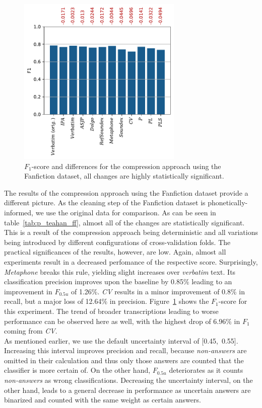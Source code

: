 \begin{figure}
  \centering
  \includegraphics[width=0.7\textwidth]{figures/results_f1_ff_teahan}
  \caption{$F_1$-score and differences for the compression approach using the Fanfiction dataset, all changes are highly statistically significant.}
  \label{fig:results_f1_ff_teahan}
\end{figure}
The results of the compression approach using the Fanfiction dataset provide a different picture.
As the cleaning step of the Fanfiction dataset is phonetically-informed, we use the original data for comparison.
As can be seen in table~\ref{tab:p_teahan_ff}, almost all of the changes are statistically significant.
This is a result of the compression approach being deterministic and all variations being introduced by different configurations of cross-validation folds.
The practical significances of the results, however, are low.
Again, almost all experiments result in a decreased perfomance of the respective score.
Surprisingly, \textit{Metaphone} breaks this rule, yielding slight increases over \textit{verbatim} text.
Its classification precision improves upon the baseline by 0.85\% leading to an improvement in $F_{0.5u}$ of 1.26\%.
\textit{CV} results in a minor improvement of 0.8\% in recall, but a major loss of 12.64\% in precision.
Figure~\ref{fig:results_f1_ff_teahan} shows the $F_1$-score for this experiment.
The trend of broader transcriptions leading to worse performance can be observed here as well, with the highest drop of 6.96\% in $F_1$ coming from \textit{CV}.\\
As mentioned earlier, we use the default uncertainty interval of [0.45,~0.55].
Increasing this interval improves precision and recall, because \textit{non-answers} are omitted in their calculation and thus only those answers are counted that the classifier is more certain of.
On the other hand, $F_{0.5u}$ deteriorates as it counts \textit{non-answers} as wrong classifications.
Decreasing the uncertainty interval, on the other hand, leads to a general decrease in performance as uncertain answers are binarized and counted with the same weight as certain answers.\\

